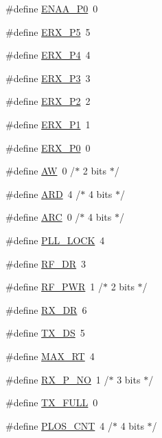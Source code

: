 \begin{DoxyCompactItemize}
\item 
\#define \hyperlink{a00013_a2cb97a8f9d05bb511d45d7212174769d}{E\-N\-A\-A\-\_\-\-P0}~0
\item 
\#define \hyperlink{a00013_af93d9be6cb2bac887584ab7f6805f7e9}{E\-R\-X\-\_\-\-P5}~5
\item 
\#define \hyperlink{a00013_a2820784961d22e1ae9499090df929ad1}{E\-R\-X\-\_\-\-P4}~4
\item 
\#define \hyperlink{a00013_a4d8b431c5dd89b67113a461fe872189a}{E\-R\-X\-\_\-\-P3}~3
\item 
\#define \hyperlink{a00013_a115f3c3d9c945bbd660c1ddcba58340d}{E\-R\-X\-\_\-\-P2}~2
\item 
\#define \hyperlink{a00013_a636432986a9972c8fc964def06ffdc79}{E\-R\-X\-\_\-\-P1}~1
\item 
\#define \hyperlink{a00013_a25999eca8c745b41102fb31489a90211}{E\-R\-X\-\_\-\-P0}~0
\item 
\#define \hyperlink{a00013_abd18e97392c5401ae01a906e1567da88}{A\-W}~0 /$\ast$ 2 bits $\ast$/
\item 
\#define \hyperlink{a00013_aa9701b150e0589afb638c82a498d1dcb}{A\-R\-D}~4 /$\ast$ 4 bits $\ast$/
\item 
\#define \hyperlink{a00013_a14727f92df7a9466f732141f23b9c252}{A\-R\-C}~0 /$\ast$ 4 bits $\ast$/
\item 
\#define \hyperlink{a00013_af76cfc0d6ed71259b4a237cbd8e30624}{P\-L\-L\-\_\-\-L\-O\-C\-K}~4
\item 
\#define \hyperlink{a00013_a1447bd35f38d6cc6d6841ca29c514675}{R\-F\-\_\-\-D\-R}~3
\item 
\#define \hyperlink{a00013_a1e9fa887f1cf285bc00c17e49569e5f5}{R\-F\-\_\-\-P\-W\-R}~1 /$\ast$ 2 bits $\ast$/
\item 
\#define \hyperlink{a00013_a312d1f2745a86149b27cff7d61e715df}{R\-X\-\_\-\-D\-R}~6
\item 
\#define \hyperlink{a00013_ab5f5243908a39ffd514fe701e9749bdc}{T\-X\-\_\-\-D\-S}~5
\item 
\#define \hyperlink{a00013_ab4482ead4f3b452a032f63ac03ee1870}{M\-A\-X\-\_\-\-R\-T}~4
\item 
\#define \hyperlink{a00013_aaafdcd7fe52991daff2385165e8547ab}{R\-X\-\_\-\-P\-\_\-\-N\-O}~1 /$\ast$ 3 bits $\ast$/
\item 
\#define \hyperlink{a00013_af3b1baf3a7a57b7471443d1ff002c778}{T\-X\-\_\-\-F\-U\-L\-L}~0
\item 
\#define \hyperlink{a00013_af45c13e8941613c7eb931001ab964965}{P\-L\-O\-S\-\_\-\-C\-N\-T}~4 /$\ast$ 4 bits $\ast$/

\end{DoxyCompactItemize}
